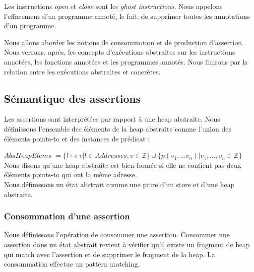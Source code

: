 \documentclass[9pt,openany]{book}
\begin{document}
	Les instructions \textit{open} et \textit{close} sont les \textit{ghost instructions}. Nous appelons l'effacement d'un programme annot\'e, le fait, de supprimer toutes les annotations d'un programme.\\ \par
	
	Nous allons aborder les notions de consommation et de production d'assertion. Nous verrons, apr\`es, les concepts d'ex\'ecutions abstraites sur les instructions annot\'ees, les fonctions annot\'ees et les programmes annot\'es. Nous finirons par la relation entre les ex\'ecutions abstraites et concr\`etes.\\
		\subsection{S\'emantique des assertions}
	Les assertions sont interpr\'et\'ees par rapport \`a une heap abstraite. Nous d\'efinissons l'ensemble des \'el\'ements de la heap abstraite comme l'union des \'el\'ements points-to et des instances de pr\'edicat :\par
	$AbsHeapElems$ $= \{l\mapsto v| l\in Addresses, v\in \mathbb{Z}\}\cup\{p(v_1,...v_n)|v_1,...,v_n\in\mathbb{Z}\}$\\
	Nous disons qu'une heap abstraite est bien-form\'ee si elle ne contient pas deux \'el\'ements points-to qui ont la m\^eme adresse.\\
	Nous d\'efinissons un \'etat abstrait comme une paire d'un store et d'une heap abstraite.
	
			\subsubsection{Consommation d'une assertion}
			Nous d\'efinissons l'op\'eration de consommer une assertion. Consommer une assertion dans un \'etat abstrait revient \`a v\'erifier qu'il existe un fragment de heap qui match avec l'assertion et de supprimer le fragment de la heap. La consommation effectue un pattern matching.\par
	
\end{document}
